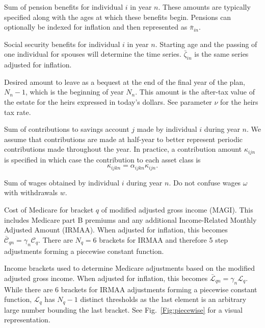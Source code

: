 \documentclass{report}[fleqn,11pt]
\begin{document}
\begin{description}[leftmargin=4em,style=multiline]
\item [$\pi_{in}$]
	Sum of pension benefits for individual $i$ in year $n$. These amounts are typically
	specified along with the ages at which these benefits begin.
	Pensions can optionally be indexed for inflation and then represented as $\bar{\pi}_{in}$.
\item [$\zeta_{in}$]
	Social security benefits for individual $i$ in year $n$. Starting age and the passing
	of one individual for spouses will determine the time series. $\bar{\zeta}_{in}$ is
	the same series adjusted for inflation.
\item [$\epsilon_{N_n}$]
	Desired amount to leave as a bequest at the end of the final year of the plan, $N_n-1$,
	which is the beginning of year $N_n$. This amount is the after-tax value of the estate
	for the heirs expressed in today's dollars. See parameter $\nu$ for the heirs tax rate.
\item [$\kappa_{ijn}$]
	Sum of contributions to savings account $j$ made by individual $i$ during year $n$.
	We assume that contributions are made at half-year to better represent periodic
        contributions made throughout the year.
	In practice, a contribution
	amount $\kappa_{ijn}$ is specified in which case the contribution to each asset
	class is
	\begin{equation}
		\kappa_{ijkn} = \alpha_{ijkn}\kappa_{ijn}.
	\end{equation}
\item [$\omega_{in}$]
	Sum of wages obtained by individual $i$ during year $n$.
	Do not confuse wages $\omega$ with withdrawals $w$.
\item [$\mathcal{C}_{q}$]
	Cost of Medicare for bracket $q$ of modified adjusted gross income (MAGI). This includes
	Medicare part B premiums and any additional
	Income-Related Monthly Adjusted Amount (IRMAA). When adjusted
	for inflation, this becomes $\bar{\mathcal{C}}_{qn} = \gamma_n\mathcal{C}_q$.
        There are $N_q = 6$ brackets for IRMAA and therefore 5 step adjustments forming
        a piecewise constant function.
\item [$\mathcal{L}_{q}$]
	Income brackets used to determine Medicare adjustments based on the modified adjusted gross income.
	When adjusted for inflation, this becomes $\bar{\mathcal{L}}_{qn} = \gamma_n\mathcal{L}_q$.
        While there are 6 brackets for IRMAA adjustments forming a piecewise constant function,
	$\mathcal{L}_q$ has $N_q - 1$ distinct thresholds as the last element is an arbitrary large
        number bounding the last bracket. See Fig.~\ref{Fig:piecewise} for a visual representation.

\end{description}
\end{document}
